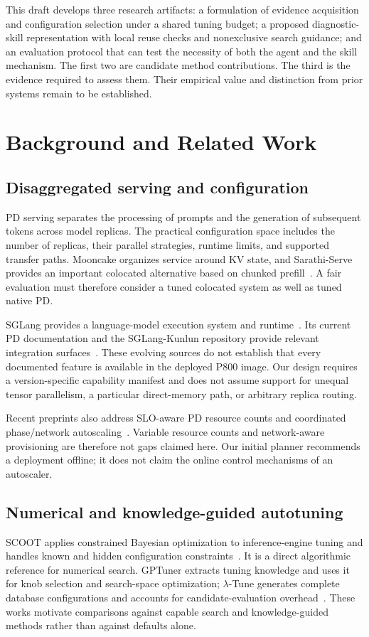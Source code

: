 \documentclass[11pt,a4paper]{article}
\begin{document}
This draft develops three research artifacts: a formulation of evidence acquisition and configuration selection under a shared tuning budget; a proposed diagnostic-skill representation with local reuse checks and nonexclusive search guidance; and an evaluation protocol that can test the necessity of both the agent and the skill mechanism. The first two are candidate method contributions. The third is the evidence required to assess them. Their empirical value and distinction from prior systems remain to be established.

\section{Background and Related Work}
\subsection{Disaggregated serving and configuration}
PD serving separates the processing of prompts and the generation of subsequent tokens across model replicas. The practical configuration space includes the number of replicas, their parallel strategies, runtime limits, and supported transfer paths. Mooncake organizes service around KV state, and Sarathi-Serve provides an important colocated alternative based on chunked prefill~\cite{mooncake2024,sarathi2024}. A fair evaluation must therefore consider a tuned colocated system as well as tuned native PD.

SGLang provides a language-model execution system and runtime~\cite{sglang2024}. Its current PD documentation and the SGLang-Kunlun repository provide relevant integration surfaces~\cite{sglangpd,kunlunplugin}. These evolving sources do not establish that every documented feature is available in the deployed P800 image. Our design requires a version-specific capability manifest and does not assume support for unequal tensor parallelism, a particular direct-memory path, or arbitrary replica routing.

Recent preprints also address SLO-aware PD resource counts and coordinated phase/network autoscaling~\cite{pdresources2026,tokenscale2025}. Variable resource counts and network-aware provisioning are therefore not gaps claimed here. Our initial planner recommends a deployment offline; it does not claim the online control mechanisms of an autoscaler.

\subsection{Numerical and knowledge-guided autotuning}
SCOOT applies constrained Bayesian optimization to inference-engine tuning and handles known and hidden configuration constraints~\cite{scoot2025}. It is a direct algorithmic reference for numerical search. GPTuner extracts tuning knowledge and uses it for knob selection and search-space optimization; $\lambda$-Tune generates complete database configurations and accounts for candidate-evaluation overhead~\cite{gptuner2024,lambdatune2025}. These works motivate comparisons against capable search and knowledge-guided methods rather than against defaults alone.
\end{document}
